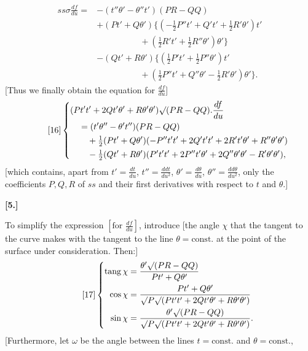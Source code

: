 %
\[
\begin{aligned}
ss\sigma\frac{df}{du}={}&-(t''\theta'-\theta''t')(PR-QQ)\\
&+(Pt'+Q\theta')\{(-\tfrac12P''t'+Q't'+\tfrac12R'\theta')t'\\
&\hspace{5em}+(\tfrac12R't'+\tfrac12R''\theta')\theta'\}\\
&-(Qt'+R\theta')\{(\tfrac12P't'+\tfrac12P''\theta')t'\\
&\hspace{5em}+(\tfrac12P''t'+Q''\theta'-\tfrac12R'\theta')\theta'\}.
\end{aligned}
\]
[Thus we finally obtain the equation for $\frac{df}{du}$]
\begin{equation}\tag*{[16]}
\left\{\begin{aligned}
&(Pt't'+2Qt'\theta'+R\theta'\theta')\mathord{\surd}(PR-QQ).\frac{df}{du}\\
&\quad=(t'\theta''-\theta't'')(PR-QQ)\\
&\qquad+\tfrac12(Pt'+Q\theta')(-P''t't'+2Q't't'+2R't'\theta'+R''\theta'\theta')\\
&\qquad-\tfrac12(Qt'+R\theta')(P't't'+2P''t'\theta'+2Q''\theta'\theta'-R'\theta'\theta'),
\end{aligned}\right.
\end{equation}
[which contains, apart from $t'=\frac{dt}{du}$, $t''=\frac{ddt}{du^2}$, $\theta'=\frac{d\theta}{du}$, $\theta''=\frac{dd\theta}{du^2}$, only the coefficients $P,Q,R$ of $ss$ and their first derivatives with respect to $t$ and $\theta$.]
\begin{center}\bfseries [5.]\end{center}
\noindent\hspace*{1.2em}To simplify the expression $\left[\text{for }\frac{df}{du}\right]$, introduce [the angle $\chi$ that the tangent to the curve makes with the tangent to the line $\theta=\text{const.}$ at the point of the surface under consideration. Then:]
\begin{equation}\tag*{[17]}
\left\{\begin{aligned}
\operatorname{tang}\chi&=\frac{\theta'\mathord{\surd}(PR-QQ)}{Pt'+Q\theta'}\\
\cos\chi&=\frac{Pt'+Q\theta'}{\mathord{\surd}P\mathord{\surd}(Pt't'+2Qt'\theta'+R\theta'\theta')}\\
\sin\chi&=\frac{\theta'\mathord{\surd}(PR-QQ)}{\mathord{\surd}P\mathord{\surd}(Pt't'+2Qt'\theta'+R\theta'\theta')}.
\end{aligned}\right.
\end{equation}
[Furthermore, let $\omega$ be the angle between the lines $t=\text{const.}$ and $\theta=\text{const.}$,
